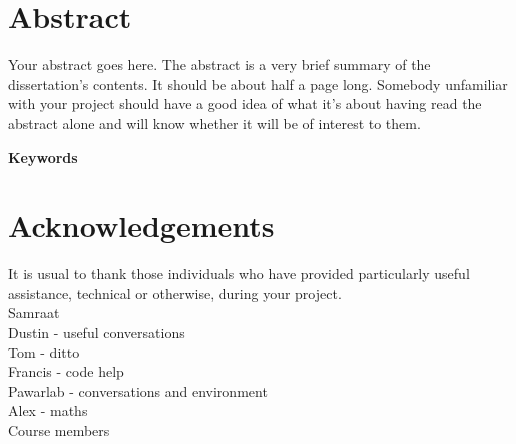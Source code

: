 \documentclass[a4paper]{article} %
\begin{document}
\section*{Abstract}\thispagestyle{plain}
    Your abstract goes here. The abstract is a very brief summary of the dissertation's contents. It should be about half a page long. Somebody unfamiliar with your project should have a good idea of what it's about having read the abstract alone and will know whether it will be of interest to them.

\textbf{Keywords} \\

\section*{Acknowledgements}\thispagestyle{plain}
    It is usual to thank those individuals who have provided particularly useful assistance, technical or otherwise, during your project. \\
    Samraat \\
    Dustin - useful conversations \\
    Tom - ditto \\
    Francis - code help \\
    Pawarlab - conversations and environment \\
    Alex - maths \\
    Course members \\

\newpage\tableofcontents\thispagestyle{plain}

\newpage\listoffigures\thispagestyle{plain}

\newpage\listoftables\thispagestyle{plain}
\end{document}
